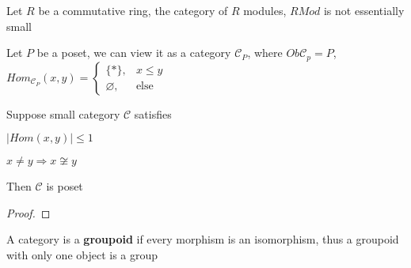 \documentclass[../main.tex]{subfiles}
\begin{document}
\begin{example}
Let $R$ be a commutative ring, the category of $R$ modules, $RMod$  is not essentially small
\end{example}

\begin{definition}
Let $P$ be a poset, we can view it as a category $\mathscr C_P$, where $Ob\mathscr C_p=P$, $Hom_{\mathscr C_P}(x,y)=\begin{cases}
\{*\}, &x\leq y \\
\varnothing, &\text{else}
\end{cases}$
\end{definition}

\begin{exercise}
Suppose small category $\mathscr C$ satisfies \par
$|Hom(x,y)|\leq1$ \par
$x\neq y\Rightarrow x\not\cong y$ \par
Then $\mathscr C$ is poset
\end{exercise}

\begin{proof}

\end{proof}

\begin{definition}
A category is a \textbf{groupoid} if every morphism is an isomorphism, thus a groupoid with only one object is a group
\end{definition}
\end{document}
